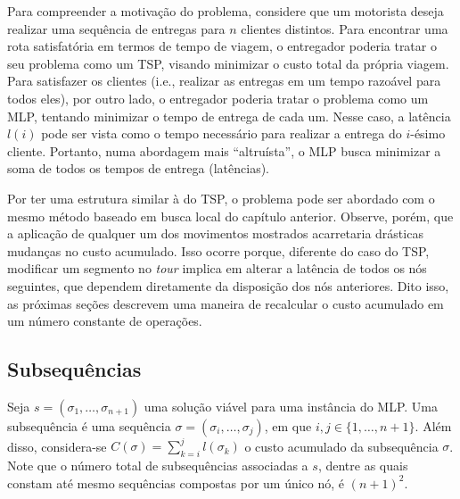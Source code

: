 Para compreender a motivação do problema, considere que um motorista deseja realizar uma sequência de entregas para $n$ clientes distintos. Para encontrar uma rota satisfatória em termos de tempo de viagem, o entregador poderia tratar o seu problema como um TSP, visando minimizar o custo total da própria viagem. Para satisfazer os clientes (i.e., realizar as entregas em um tempo razoável para todos eles), por outro lado, o entregador poderia tratar o problema como um MLP, tentando minimizar o tempo de entrega de cada um. Nesse caso, a latência $l(i)$ pode ser vista como o tempo necessário para realizar a entrega do $i$-ésimo cliente. Portanto, numa abordagem mais ``altruísta'', o MLP busca minimizar a soma de todos os tempos de entrega (latências). 

Por ter uma estrutura similar à do TSP, o problema pode ser abordado com o mesmo método baseado em busca local do capítulo anterior. Observe, porém, que a aplicação de qualquer um dos movimentos mostrados acarretaria drásticas mudanças no custo acumulado. Isso ocorre porque, diferente do caso do TSP, modificar um segmento no \textit{tour} implica em alterar a latência de todos os nós seguintes, que dependem diretamente da disposição dos nós anteriores. Dito isso, as próximas seções descrevem uma maneira de recalcular o custo acumulado em um número constante de operações.


\subsection{Subsequências}
Seja \(s = (\sigma_1, \dots, \sigma_{n+1})\) uma solução viável para uma instância do MLP. Uma subsequência é uma sequência \(\sigma = (\sigma_i, \dots, \sigma_j)\), em que \(i, j \in \{1,\dots, n+1\}\). Além disso, considera-se $C(\sigma) = \sum_{k=i}^{j} l(\sigma_k)$ o custo acumulado da subsequência $\sigma$. Note que o número total de subsequências associadas a $s$, dentre as quais constam até mesmo sequências compostas por um único nó, é $(n+1)^2$.

